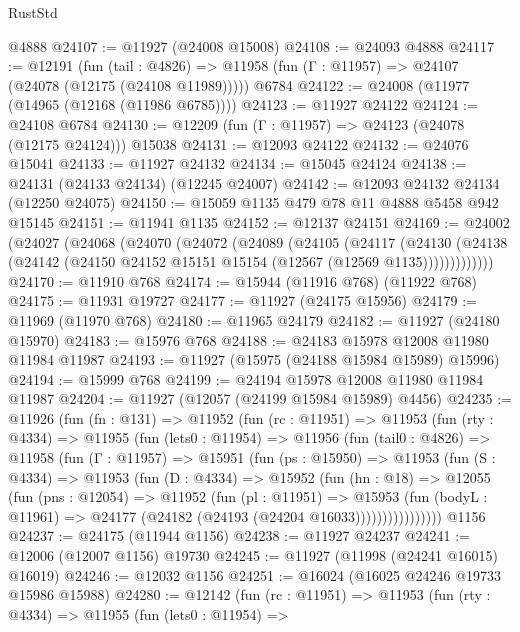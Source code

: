 \begin{lexlean}{RustStd}
\begin{coremodule}
    @4888
@24107 := @11927 (@24008 @15008)
@24108 := @24093 @4888
@24117 := @12191
    (fun (tail : @4826) => @11958 (fun (Γ : @11957) => @24107 (@24078 (@12175 (@24108 @11989)))))
    @6784
@24122 := @24008 (@11977 (@14965 (@12168 (@11986 @6785))))
@24123 := @11927 @24122
@24124 := @24108 @6784
@24130 := @12209 (fun (Γ : @11957) => @24123 (@24078 (@12175 @24124))) @15038
@24131 := @12093 @24122
@24132 := @24076 @15041
@24133 := @11927 @24132
@24134 := @15045 @24124
@24138 := @24131 (@24133 @24134) (@12245 @24007)
@24142 := @12093 @24132 @24134 (@12250 @24075)
@24150 := @15059 @1135 @479 @78 @11 @4888 @5458 @942 @15145
@24151 := @11941 @1135
@24152 := @12137 @24151
@24169 := @24002
    (@24027
      (@24068
        (@24070
          (@24072
            (@24089
              (@24105
                (@24117
                  (@24130
                    (@24138 (@24142 (@24150 @24152 @15151 @15154 (@12567 (@12569 @1135)))))))))))))
@24170 := @11910 @768
@24174 := @15944 (@11916 @768) (@11922 @768)
@24175 := @11931 @19727
@24177 := @11927 (@24175 @15956)
@24179 := @11969 (@11970 @768)
@24180 := @11965 @24179
@24182 := @11927 (@24180 @15970)
@24183 := @15976 @768
@24188 := @24183 @15978 @12008 @11980 @11984 @11987
@24193 := @11927 (@15975 (@24188 @15984 @15989) @15996)
@24194 := @15999 @768
@24199 := @24194 @15978 @12008 @11980 @11984 @11987
@24204 := @11927 (@12057 (@24199 @15984 @15989) @4456)
@24235 := @11926
    (fun (fn : @131) =>
    @11952
      (fun (rc : @11951) =>
      @11953
        (fun (rty : @4334) =>
        @11955
          (fun (lets0 : @11954) =>
          @11956
            (fun (tail0 : @4826) =>
            @11958
              (fun (Γ : @11957) =>
              @15951
                (fun (ps : @15950) =>
                @11953
                  (fun (S : @4334) =>
                  @11953
                    (fun (D : @4334) =>
                    @15952
                      (fun (hn : @18) =>
                      @12055
                        (fun (pns : @12054) =>
                        @11952
                          (fun (pl : @11951) =>
                          @15953
                            (fun (bodyL : @11961) =>
                            @24177 (@24182 (@24193 (@24204 @16033))))))))))))))))
    @1156
@24237 := @24175 (@11944 @1156)
@24238 := @11927 @24237
@24241 := @12006 (@12007 @1156) @19730
@24245 := @11927 (@11998 (@24241 @16015) @16019)
@24246 := @12032 @1156
@24251 := @16024 (@16025 @24246 @19733 @15986 @15988)
@24280 := @12142
    (fun (rc : @11951) =>
    @11953
      (fun (rty : @4334) =>
      @11955
        (fun (lets0 : @11954) =>

\end{coremodule}
\end{lexlean}
